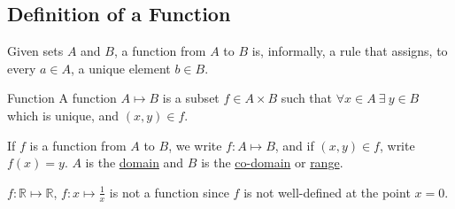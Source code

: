 \documentclass[../Main.tex]{subfiles}
\begin{document}
\subsection{Definition of a Function}
Given sets $A$ and $B$, a function from $A$ to $B$ is, informally, a rule that assigns, to every $a \in A$, a unique element $b \in B$.
\begin{definition}{Function}
    A function $A \mapsto B$ is a subset $f \in A \times B$ such that $\forall x \in A~\exists~y \in B$ which is unique, and $(x, y) \in f$.
\end{definition}
If $f$ is a function from $A$ to $B$, we write $f : A \mapsto B$, and if $(x, y) \in f$, write $f(x) = y$. $A$ is the \underline{domain} and $B$ is the \underline{co-domain} or \underline{range}.
\begin{example}
    $f : \mathbb{R} \mapsto \mathbb{R}$, $f : x \mapsto \frac{1}{x}$ is not a function since $f$ is not well-defined at the point $x=0$.
\end{example}
\end{document}

